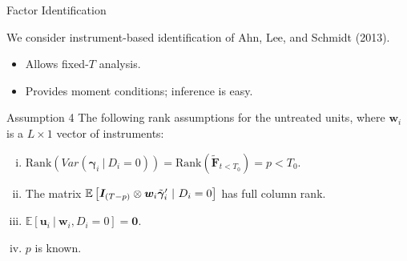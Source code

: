 \documentclass{beamer}
\newcommand{\1}{\mathds{1}} %
\newcommand{\condexpec}[2]{\mathbb{E}\left[#1 \ \vert \ #2\right]}
\begin{document}
\begin{frame}{Factor Identification}

We consider instrument-based identification of Ahn, Lee, and Schmidt (2013).
\begin{itemize}
    \item Allows fixed-$T$ analysis.
    \item Provides moment conditions; inference is easy.
\end{itemize}

\begin{block}{Assumption 4}
    The following rank assumptions for the untreated units, where $\bm w_i$ is a $L \times 1$ vector of instruments: 
\begin{enumerate}[(i)]
    \item $\text{Rank}( Var(\bm \gamma_i \ \vert \ D_i = 0 ) ) = \text{Rank}(\tilde{\bm F}_{t < T_0}) = p < T_0$.
    \item The matrix $\mathbb{E}\left[\bm I_{(T-p)} \otimes \bm w_i \tilde{\bm \gamma}_i' \ \vert \ D_i = 0\right]$ has full column rank.
    \item $\condexpec{\bm u_i}{\bm w_i, D_i = 0} = \bm 0$.
    \item $p$ is known.
\end{enumerate}
\end{block}
    
\end{frame}

\end{document}
